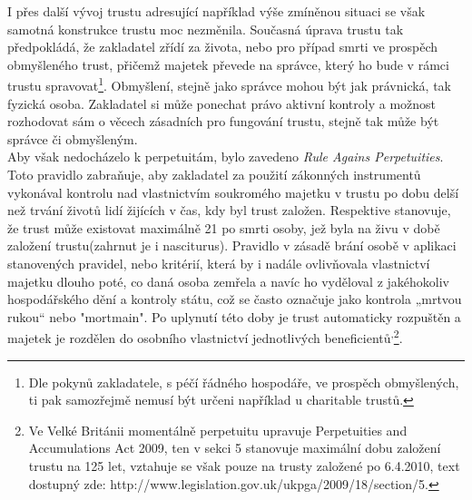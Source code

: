 \documentclass{article}
\begin{document}
I přes další vývoj trustu adresující například výše zmíněnou situaci se však samotná konstrukce trustu moc nezměnila. Současná úprava trustu tak předpokládá, že zakladatel zřídí za života, nebo pro případ smrti ve prospěch obmyšleného trust, přičemž majetek převede na správce, který ho bude v rámci trustu spravovat\footnote{Dle pokynů zakladatele, s péčí řádného hospodáře, ve prospěch obmyšlených, ti pak samozřejmě nemusí být určeni například u charitable trustů.}. Obmyšlení, stejně jako správce mohou být jak právnická, tak fyzická osoba. Zakladatel si může ponechat právo aktivní kontroly a možnost rozhodovat sám o věcech zásadních pro fungování trustu, stejně tak může být správce či obmyšleným.\\

Aby však nedocházelo k perpetuitám, bylo zavedeno \textit{Rule Agains Perpetuities}. Toto pravidlo zabraňuje, aby zakladatel za použití zákonných instrumentů vykonával kontrolu nad vlastnictvím soukromého majetku v trustu po dobu delší než trvání životů lidí žijících v čas, kdy byl trust založen. Respektive stanovuje, že trust může existovat maximálně 21 po smrti osoby, jež byla na živu v době založení trustu(zahrnut je i nasciturus). Pravidlo v zásadě brání osobě v aplikaci stanovených pravidel, nebo kritérií, která by i nadále ovlivňovala vlastnictví majetku dlouho poté, co daná osoba zemřela a navíc ho vyděloval z jakéhokoliv hospodářského dění a kontroly státu, což se často označuje jako kontrola „mrtvou rukou“ nebo "mortmain". Po uplynutí této doby je trust automaticky rozpuštěn a majetek je rozdělen do osobního vlastnictví jednotlivých beneficientů\textsuperscript{,}\footnote{Ve Velké Británii momentálně perpetuitu upravuje Perpetuities and Accumulations Act 2009, ten v sekci 5 stanovuje maximální dobu založení trustu na 125 let, vztahuje se však pouze na trusty založené po 6.4.2010, text dostupný zde: http://www.legislation.gov.uk/ukpga/2009/18/section/5.}.\\



\end{document}
